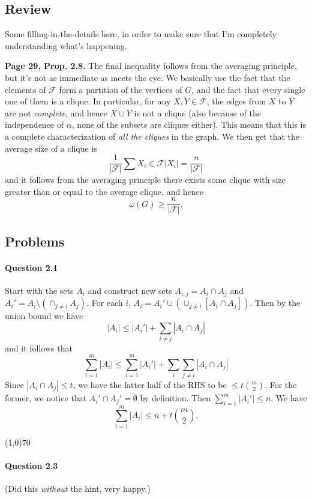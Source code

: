 \subsection{Review}

Some filling-in-the-details here, in order to make sure that I'm completely understanding what's happening.

\textbf{Page 29, Prop. 2.8.} The final inequality follows from the averaging principle, but it's not as immediate as meets the eye. We basically use the fact that the elements of $\mathcal{F}$ form a partition of the vertices of $G$, and the fact that every single one of them is a clique. In particular, for any $X,Y\in\mathcal{F}$, the edges from $X$ to $Y$ are not \textit{complete}, and hence $X\cup Y$ is not a clique (also because of the independence of $\alpha$, none of the subsets are cliques either). This means that this is a complete characterization of \textit{all the cliques} in the graph. We then get that the average size of a clique is
$$\frac{1}{|\mathcal{F}|}\sum{X_i\in\mathcal{F}}|X_i| = \frac{n}{|\mathcal{F}|}$$
and it follows from the averaging principle there exists some clique with size greater than or equal to the average clique, and hence
$$\omega(G)\geq\frac{n}{|\mathcal{F}|}.$$

\subsection{Problems}

\paragraph{Question 2.1} Start with the sets $A_i$ and construct new sets $A_{i,j}=A_i\cap A_j$ and $A_i' = A_i\setminus(\cap_{j\neq i} A_j)$. For each $i$, $A_i = A_i'\cup (\cup_{j\neq i} [A_i\cap A_j])$. Then by the union bound we have
$$|A_i|\leq |A_i'|+\sum_{i\neq j}|A_i\cap A_j|$$
and it follows that 
$$\sum_{i=1}^m |A_i| \leq \sum_{i=1}^m |A_i'| + \sum_{i}\sum_{j\neq i}|A_i\cap A_j|$$
Since $|A_i\cap A_j|\leq t$, we have the latter half of the RHS to be $\leq t\binom{m}{2}$. For the former, we notice that $A_i'\cap A_j'=\emptyset$ by definition. Then $\sum_{i=1}^m |A_i'|\leq n$. We have
$$\sum_{i=1}^m |A_i|\leq n + t\binom{m}{2}.$$

\begin{center}
	\line(1,0){70}
\end{center}

\paragraph{Question 2.3} (Did this \textit{without} the hint, very happy.) 

